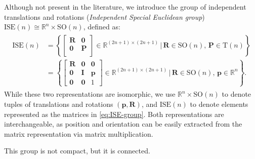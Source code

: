 \begin{example}\label{ex:independent-translation-rotation-ISE}
    Although not present in the literature, we introduce the group of independent translations and rotations (\emph{Independent Special Euclidean group}) $\text{ISE}(n)\cong\mathbb{R}^n\times\text{SO}(n)$, defined as:
    \begin{align}
        \begin{split}
            \text{ISE}(n) &= \left\{\begin{bmatrix}
            \mathbf{R} & \mathbf{0}\\
            \mathbf{0} & \mathbf{P}\\
            \end{bmatrix}\in\mathbb{R}^{(2n+1)\times(2n+1)}\,|\, \mathbf{R}\in\text{SO}(n),\,\mathbf{P}\in\text{T}(n)\right\}\\
            &= \left\{\begin{bmatrix}
            \mathbf{R} & \mathbf{0} & \mathbf{0}\\
            \mathbf{0} & \mathbf{I} & \mathbf{p}\\
            \mathbf{0} & \mathbf{0} & 1
            \end{bmatrix}\in\mathbb{R}^{(2n+1)\times(2n+1)}\,|\, \mathbf{R}\in\text{SO}(n),\,\mathbf{p}\in\mathbb{R}^n\right\}.
        \end{split} \label{eq:ISE-group}
    \end{align}
    While these two representations are isomorphic, we use $\mathbb{R}^n\times \text{SO}(n)$ to denote tuples of translations and rotations $(\mathbf{p},\mathbf{R})$, and $\text{ISE}(n)$ to denote elements represented as the matrices in \eqref{eq:ISE-group}. Both representations are interchangeable, as position and orientation can be easily extracted from the matrix representation via matrix multiplication.

    This group is not compact, but it is connected.
\end{example}
